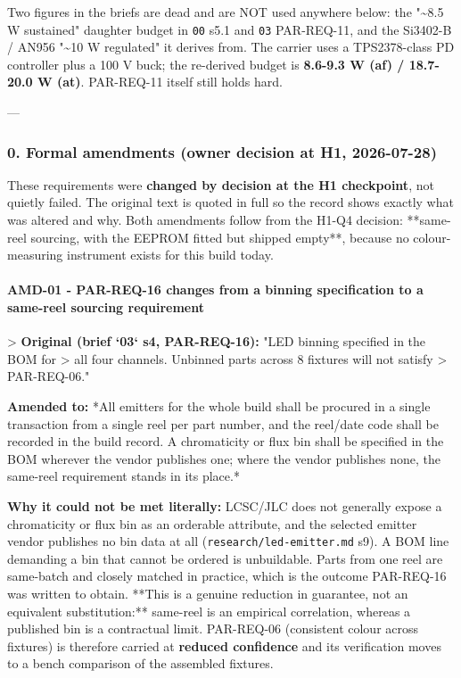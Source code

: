 \documentclass[11pt,a4paper]{article}
\begin{document}
Two figures in the briefs are dead and are NOT used anywhere below: the "\textasciitilde{}8.5 W sustained" daughter budget in \texttt{00} s5.1 and \texttt{03} PAR-REQ-11, and the Si3402-B / AN956 "\textasciitilde{}10 W regulated" it derives from. The carrier uses a TPS2378-class PD controller plus a 100 V buck; the re-derived budget is \textbf{8.6-9.3 W (af) / 18.7-20.0 W (at)}. PAR-REQ-11 itself still holds hard.

---

\subsubsection*{0. Formal amendments (owner decision at H1, 2026-07-28)}
These requirements were \textbf{changed by decision at the H1 checkpoint}, not quietly failed. The original text is quoted in full so the record shows exactly what was altered and why. Both amendments follow from the H1-Q4 decision: {*}{*}same-reel sourcing, with the EEPROM fitted but shipped empty{*}{*}, because no colour-measuring instrument exists for this build today.

\paragraph*{AMD-01 - PAR-REQ-16 changes from a binning specification to a same-reel sourcing requirement}
\textgreater{} \textbf{Original (brief `03` s4, PAR-REQ-16):} "LED binning specified in the BOM for \textgreater{} all four channels. Unbinned parts across 8 fixtures will not satisfy \textgreater{} PAR-REQ-06."

\textbf{Amended to:} {*}All emitters for the whole build shall be procured in a single transaction from a single reel per part number, and the reel/date code shall be recorded in the build record. A chromaticity or flux bin shall be specified in the BOM wherever the vendor publishes one; where the vendor publishes none, the same-reel requirement stands in its place.{*}

\textbf{Why it could not be met literally:} LCSC/JLC does not generally expose a chromaticity or flux bin as an orderable attribute, and the selected emitter vendor publishes no bin data at all (\texttt{research/led-emitter.md} s9). A BOM line demanding a bin that cannot be ordered is unbuildable. Parts from one reel are same-batch and closely matched in practice, which is the outcome PAR-REQ-16 was written to obtain. {*}{*}This is a genuine reduction in guarantee, not an equivalent substitution:{*}{*} same-reel is an empirical correlation, whereas a published bin is a contractual limit. PAR-REQ-06 (consistent colour across fixtures) is therefore carried at \textbf{reduced confidence} and its verification moves to a bench comparison of the assembled fixtures.
\end{document}
